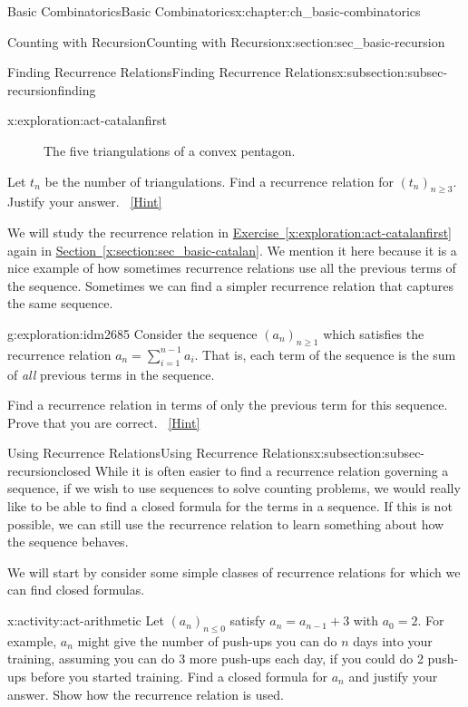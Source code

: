 \documentclass[oneside,10pt,]{book}
\numberwithin{equation}{chapter}
\begin{document}
\begin{chapterptx}{Basic Combinatorics}{}{Basic Combinatorics}{}{}{x:chapter:ch_basic-combinatorics}
\begin{sectionptx}{Counting with Recursion}{}{Counting with Recursion}{}{}{x:section:sec_basic-recursion}
\begin{subsectionptx}{Finding Recurrence Relations}{}{Finding Recurrence Relations}{}{}{x:subsection:subsec-recursionfinding}
\begin{exploration}{}{x:exploration:act-catalanfirst}
\begin{figure}
\begin{sidebyside}{5}{0}{0}{0}
\end{sidebyside}%
\caption{The five triangulations of a convex pentagon.\label{x:figure:five5gons}}
\end{figure}
Let \(t_n\) be the number of triangulations.  Find a recurrence relation for \((t_n)_{n \ge 3}\).  Justify your answer.%
\qquad~\hfill{\tiny\hyperlink{g:hint:idm2677-back}{[Hint]}}\end{exploration}
We will study the recurrence relation in \hyperref[x:exploration:act-catalanfirst]{Exercise~\ref{x:exploration:act-catalanfirst}} again in \hyperref[x:section:sec_basic-catalan]{Section~\ref{x:section:sec_basic-catalan}}.  We mention it here because it is a nice example of how sometimes recurrence relations use all the previous terms of the sequence.  Sometimes we can find a simpler recurrence relation that captures the same sequence.%
\begin{exploration}{}{g:exploration:idm2685}%
Consider the sequence \((a_n)_{n \ge 1}\) which satisfies the recurrence relation \(a_n = \sum_{i = 1}^{n-1} a_i\).  That is, each term of the sequence is the sum of \emph{all} previous terms in the sequence.%
\par
Find a recurrence relation in terms of only the previous term for this sequence.  Prove that you are correct.%
\qquad~\hfill{\tiny\hyperlink{g:hint:idm2692-back}{[Hint]}}\end{exploration}
\end{subsectionptx}
%
%
\typeout{************************************************}
\typeout{************************************************}
%
\begin{subsectionptx}{Using Recurrence Relations}{}{Using Recurrence Relations}{}{}{x:subsection:subsec-recursionclosed}
While it is often easier to find a recurrence relation governing a sequence, if we wish to use sequences to solve counting problems, we would really like to be able to find a closed formula for the terms in a sequence. If this is not possible, we can still use the recurrence relation to learn something about how the sequence behaves.%
\par
We will start by consider some simple classes of recurrence relations for which we can find closed formulas.%
\begin{activity}{}{x:activity:act-arithmetic}%
Let \((a_n)_{n \le 0}\) satisfy \(a_n = a_{n-1} + 3\) with \(a_0 = 2\).  For example, \(a_n\) might give the number of push-ups you can do \(n\) days into your training, assuming you can do 3 more push-ups each day, if you could do 2 push-ups before you started training.  Find a closed formula for \(a_n\) and justify your answer.  Show how the recurrence relation is used.%

\end{activity}
\end{subsectionptx}
\end{sectionptx}
\end{chapterptx}
\end{document}
